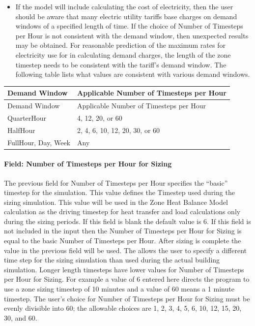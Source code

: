 \begin{itemize}
    \item
    If the model will include calculating the cost of electricity, then the user should be aware that many electric utility tariffs base charges on demand windows of a specified length of time. If the choice of Number of Timesteps per Hour is not consistent with the demand window, then unexpected results may be obtained. For reasonable prediction of the maximum rates for electricity use for in calculating demand charges, the length of the zone timestep needs to be consistent with the tariff's demand window. The following table lists what values are consistent with various demand windows.
\end{itemize}

\begin{longtable}[c]{@{}ll@{}}
    \toprule
    Demand Window & Applicable Number of Timesteps per Hour \tabularnewline
    \midrule
    \endfirsthead

    \toprule
    Demand Window & Applicable Number of Timesteps per Hour \tabularnewline
    \midrule
    \endhead

    QuarterHour & 4, 12, 20, or 60 \tabularnewline
    HalfHour & 2, 4, 6, 10, 12, 20, 30, or 60 \tabularnewline
    FullHour, Day, Week & Any \tabularnewline
    \bottomrule
\end{longtable}

\paragraph{Field: Number of Timesteps per Hour for Sizing}\label{field-number-of-timesteps-per-hour-for-sizing}

The previous field for Number of Timesteps per Hour specifies the ``basic'' timestep for the simulation. This value defines the Timestep used during the sizing simulation. This value will be used in the Zone Heat Balance Model calculation as the driving timestep for heat transfer and load calculations only during the sizing periods. If this field is blank the default value is 6. If this field is not included in the input then the Number of Timesteps per Hour for Sizing is equal to the basic Number of Timesteps per Hour. After sizing is complete the value in the previous field will be used. The allows the user to specify a different time step for the sizing simulation than used during the actual building simulation. Longer length timesteps have lower values for Number of Timesteps per Hour for Sizing. For example a value of 6 entered here directs the program to use a zone sizing timestep of 10 minutes and a value of 60 means a 1 minute timestep. The user's choice for Number of Timesteps per Hour for Sizing must be evenly divisible into 60; the allowable choices are 1, 2, 3, 4, 5, 6, 10, 12, 15, 20, 30, and 60.

